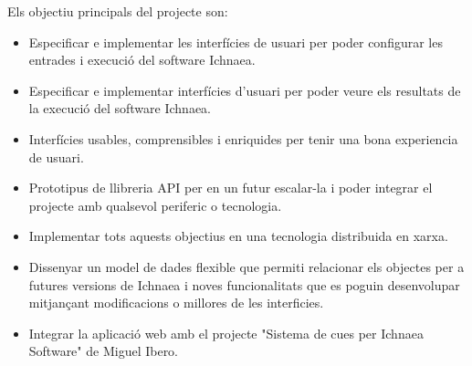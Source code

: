 Els objectiu principals del projecte son:\\

\begin{itemize}
\item Especificar e implementar les interf\'{i}cies de usuari per poder configurar les entrades i execuci\'{o} del software Ichnaea.
\item Especificar e implementar interf\'{i}cies d'usuari per poder veure els resultats de la execuci\'{o} del software Ichnaea. 
\item Interf\'{i}cies usables, comprensibles i enriquides per tenir una bona experiencia de usuari. 
\item Prototipus de llibreria API per en un futur escalar-la i poder integrar el projecte amb qualsevol periferic o tecnologia. 
\item Implementar tots aquests objectius en una tecnologia distribuida en xarxa. 
\item Dissenyar un model de dades flexible que permiti relacionar els objectes per a futures versions de Ichnaea i noves funcionalitats que es poguin desenvolupar mitjançant modificacions o millores de les interficies. 
\item Integrar la aplicaci\'{o} web amb el projecte "Sistema de cues per Ichnaea Software" de Miguel Ibero.
\end{itemize}
